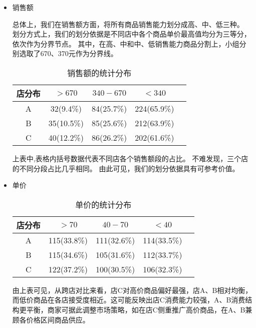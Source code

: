 \documentclass[withoutpreface,bwprint]{cumcmthesis}
\begin{document}
\begin{itemize}[itemindent=2em]
\item 销售额
\par
总体上，我们在销售额方面，将所有商品销售能力划分成高、中、低三种。
划分方式上，我们的划分依据是不同店中各个商品单价最高值均分为三等分，
依次作为分界节点。
其中，在高、中和中、低销售能力商品分割上，小组分别选取了670、370元作为分界线。

\begin{table}[H]
    \caption{销售额的统计分布}%
    \centering
    \fontsize{12}{14}\selectfont   
    \begin{tabular}{ccccc}
        \toprule[1.5pt]
        店分布 & $>670$ & $340-670$ & $<340$ \\
        \midrule[1pt]
        A & 32(9.4\%) & 84(25.7\%) & 224(65.9\%) \\
        B & 35(10.5\%) & 85(25.6\%) & 212(63.9\%) \\
        C & 40(12.2\%) & 86(26.2\%) & 202(61.6\%) \\
        \bottomrule[1.5pt]
    \end{tabular}
\end{table}

上表中,表格内括号数据代表不同店各个销售额段的占比。
不难发现，三个店的不同分段占比几乎相同。
由此可见，我们的划分依据具有可参考价值。
\item 单价
\par

\begin{table}[H]
    \caption{单价的统计分布}%
    \centering
    \fontsize{12}{14}\selectfont   
    \begin{tabular}{ccccc}
        \toprule[1.5pt]
        店分布 & $>70$ & $40-70$ & $<40$ \\
        \midrule[1pt]
        A & 115(33.8\%) & 111(32.6\%) & 114(33.5\%) \\
        B & 115(34.6\%) & 105(31.6\%) & 112(33.7\%) \\
        C & 122(37.2\%) & 100(30.5\%) & 106(32.3\%) \\
        \bottomrule[1.5pt]
    \end{tabular}
\end{table}

由上表可见，从跨店对比来看，店C对高价商品偏好最强，店A、B相对均衡，而低价商品在各店接受度相近。这可能反映出店C消费能力较强，A、B消费结构更平衡，商家可据此调整市场策略，如在店C侧重推广高价商品，在A、B兼顾各价格区间商品供应。




\end{itemize}
\end{document}
